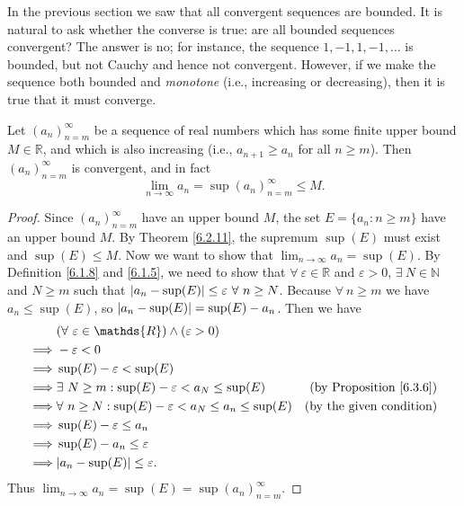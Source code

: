 \begin{note}
In the previous section we saw that all convergent sequences are bounded.
It is natural to ask whether the converse is true:
are all bounded sequences convergent?
The answer is no;
for instance, the sequence \(1, -1, 1, -1, \dots\) is bounded, but not Cauchy and hence not convergent.
However, if we make the sequence both bounded and \emph{monotone} (i.e., increasing or decreasing), then it is true that it must converge.
\end{note}

\begin{proposition}\label{6.3.8}
Let \((a_n)_{n = m}^\infty\) be a sequence of real numbers which has some finite upper bound \(M \in \mathds{R}\), and which is also increasing (i.e., \(a_{n + 1} \geq a_n\) for all \(n \geq m\)).
Then \((a_n)_{n = m}^\infty\) is convergent, and in fact
\[
    \lim_{n \to \infty} a_n = \sup(a_n)_{n = m}^\infty \leq M.
\]
\end{proposition}

\begin{proof}
Since \((a_n)_{n = m}^\infty\) have an upper bound \(M\), the set \(E = \{a_n : n \geq m\}\) have an upper bound \(M\).
By Theorem \ref{6.2.11}, the supremum \(\sup(E)\) must exist and \(\sup(E) \leq M\).
Now we want to show that \(\lim_{n \to \infty} a_n = \sup(E)\).
By Definition \ref{6.1.8} and \ref{6.1.5}, we need to show that \(\forall\ \varepsilon \in \mathds{R}\) and \(\varepsilon > 0\), \(\exists\ N \in \mathds{N}\) and \(N \geq m\) such that \(\abs*{a_n - \sup(E)} \leq \varepsilon \ \forall\ n \geq N\).
Because \(\forall\ n \geq m\) we have \(a_n \leq \sup(E)\), so \(\abs*{a_n - \sup(E)} = \sup(E) - a_n\).
Then we have
\begin{align*}
& (\forall\ \varepsilon \in \mathds{R}) \land (\varepsilon > 0) \\
\implies & -\varepsilon < 0 \\
\implies & \sup(E) - \varepsilon < \sup(E) \\
\implies & \exists\ N \geq m : \sup(E) - \varepsilon < a_N \leq \sup(E) & \text{(by Proposition \ref{6.3.6})} \\
\implies & \forall\ n \geq N : \sup(E) - \varepsilon < a_N \leq a_n \leq \sup(E) & \text{(by the given condition)} \\
\implies & \sup(E) - \varepsilon \leq a_n \\
\implies & \sup(E) - a_n \leq \varepsilon \\
\implies & \abs*{a_n - \sup(E)} \leq \varepsilon.
\end{align*}
Thus \(\lim_{n \to \infty} a_n = \sup(E) = \sup(a_n)_{n = m}^\infty\).
\end{proof}

